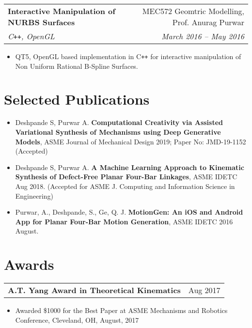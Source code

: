 \documentclass[letterpaper,10pt]{article}
\makeatletter
\newcommand{\resumeHeading}[4]{
  \vspace{-1pt}
    \begin{tabular*}{0.97\textwidth}{l@{\extracolsep{\fill}}r}
      \textbf{#1} & #2 \vspace{-2pt}\\ \vspace{1pt}
      \textit{\small#3} & \textit{\small #4} \\
    \end{tabular*}
}
\newcommand{\resumeSubheadingWithDate}[2]{
    \begin{tabular*}{0.97\textwidth}{l@{\extracolsep{\fill}}r}
      \small\textbf{#1} & \small #2 \\
    \end{tabular*}
    \vspace{+2pt}
}
\newcommand{\resumeSection}[1]{
\vspace{-12pt}
\section{\textbf{#1}}
}
\newcommand{\resumeItemListStart}{
\vspace{-7pt}
\begin{itemize}[leftmargin=14pt]
}
\newcommand{\resumeItemListEnd}{
\vspace{+7pt}
\end{itemize}
}
\newcommand{\resumeItem}[1]{
  \item\small{
      {#1 \vspace{-7pt}
      }
  }
}
\makeatother
\begin{document}
    \vspace{-10pt}
    \resumeHeading{Interactive Manipulation of NURBS Surfaces}{MEC572 Geomtric Modelling, Prof. Anurag Purwar}{C\texttt{++}, OpenGL}{March 2016 -- May 2016}
    \resumeItemListStart
      \resumeItem{QT5, OpenGL based implementation in C\texttt{++} for interactive manipulation of Non Uniform Rational B-Spline Surfaces.}
    \resumeItemListEnd

\resumeSection{Selected Publications}
\vspace{+7pt}
    \resumeItemListStart
      \resumeItem{Deshpande S, Purwar A. \textbf{Computational Creativity via Assisted Variational Synthesis of Mechanisms using Deep Generative Models},  ASME Journal of Mechanical Design 2019; Paper No: JMD-19-1152 (Accepted)}
      \resumeItem{Deshpande S, Purwar A. \textbf{A Machine Learning Approach to Kinematic Synthesis of Defect-Free Planar Four-Bar Linkages}, ASME IDETC Aug 2018. (Accepted for ASME J. Computing and Information Science in Engineering)}
      \resumeItem{Purwar, A., Deshpande, S., Ge, Q. J. \textbf{MotionGen: An iOS and Android App for Planar Four-Bar Motion Generation}, ASME IDETC 2016 August.}
    \resumeItemListEnd

\resumeSection{Awards}
    \resumeSubheadingWithDate{A.T. Yang Award in Theoretical Kinematics}{Aug 2017}
    \resumeItemListStart
      \resumeItem{Awarded \$1000 for the Best Paper at ASME Mechanisms and Robotics Conference, Cleveland, OH, August, 2017}
    \resumeItemListEnd
\end{document}
